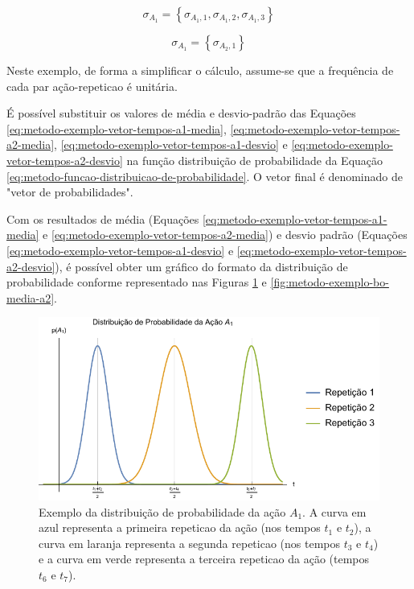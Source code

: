 \begin{equation}
    \sigma_{A_1} = \left\{
		\sigma_{{A_1},1}, 
		\sigma_{{A_1},2}, 	
		\sigma_{{A_1},3}
	\right\}
	\label{eq:metodo-exemplo-vetor-tempos-a1-desvio}
\end{equation}

\begin{equation}
    \sigma_{A_1} = \left\{
		\sigma_{{A_2},1}
	\right\}
	\label{eq:metodo-exemplo-vetor-tempos-a2-desvio}
\end{equation}

Neste exemplo, de forma a simplificar o cálculo, assume-se que a frequência de cada par ação-\gls{repeticao} é unitária.

É possível substituir os valores de média e desvio-padrão das Equações \ref{eq:metodo-exemplo-vetor-tempos-a1-media}, \ref{eq:metodo-exemplo-vetor-tempos-a2-media}, \ref{eq:metodo-exemplo-vetor-tempos-a1-desvio} e \ref{eq:metodo-exemplo-vetor-tempos-a2-desvio} na função distribuição de probabilidade da Equação \ref{eq:metodo-funcao-distribuicao-de-probabilidade}. O vetor final é denominado de "vetor de probabilidades".

Com os resultados de média (Equações \ref{eq:metodo-exemplo-vetor-tempos-a1-media} e \ref{eq:metodo-exemplo-vetor-tempos-a2-media}) e desvio padrão (Equações \ref{eq:metodo-exemplo-vetor-tempos-a1-desvio} e \ref{eq:metodo-exemplo-vetor-tempos-a2-desvio}), é possível obter um gráfico do formato da distribuição de probabilidade conforme representado nas Figuras \ref{fig:metodo-exemplo-bo-media-a1} e \ref{fig:metodo-exemplo-bo-media-a2}.

\begin{figure}[htb]
	\caption{\label{fig:metodo-exemplo-bo-media-a1} Exemplo da distribuição de probabilidade da ação $A_1$. A curva em azul representa a primeira \gls{repeticao} da ação (nos tempos $t_1$ e $t_2$), a curva em laranja representa a segunda \gls{repeticao} (nos tempos $t_3$ e $t_4$) e a curva em verde representa a terceira \gls{repeticao} da ação (tempos $t_6$ e $t_7$).}
	\begin{center}
	    \includegraphics[width=\linewidth]{../Mathematica/Images/Exemplo_BO_Media_A1.pdf}
	\end{center}
\end{figure}

